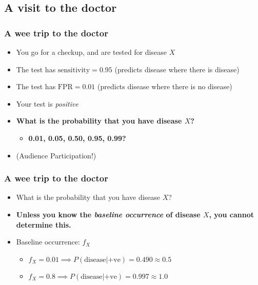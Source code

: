 
\subsection{A visit to the doctor}

\begin{frame}
  \frametitle{A wee trip to the doctor}
  \begin{itemize}
    \item<1-> You go for a checkup, and are tested for disease $X$
    \item<1-> The test has \textbf{$\text{sensitivity}=0.95$} (predicts disease where there is disease)
    \item<1-> The test has \textbf{$\text{FPR}=0.01$} (predicts disease where there is no disease)
    \item<2-> Your test is \emph{positive}
    \item<2-> \textbf{What is the probability that you have disease $X$?}
    \begin{itemize}
      \item \textbf{0.01, 0.05, 0.50, 0.95, 0.99?}
    \end{itemize}
    \item<2-> (Audience Participation!)
  \end{itemize} 
\end{frame}

\begin{frame}
  \frametitle{A wee trip to the doctor}
  \begin{itemize}
    \item<1-> What is the probability that you have disease $X$?
    \item<1-> \textbf{Unless you know the \emph{baseline occurrence} of disease $X$, you cannot determine this.}
    \item<2-> Baseline occurrence: $f_X$
    \begin{itemize}
      \item $f_X = 0.01 \implies P(\text{disease}|\text{+ve}) = 0.490 \approx 0.5$
      \item $f_X = 0.8 \implies P(\text{disease}|\text{+ve}) = 0.997 \approx 1.0$         
    \end{itemize}
  \end{itemize} 
\end{frame}



